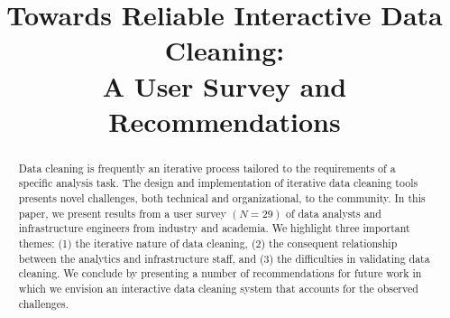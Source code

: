 \documentclass{sig-alternate-05-2015}
\begin{document}
\newtheorem{theorem}{Theorem}
\newtheorem{example}{Example}
\newtheorem{definition}{Definition}
\newtheorem{problem}{Problem}
\newtheorem{property}{Property}
\newtheorem{proposition}{Proposition}
\newtheorem{lemma}{Lemma}
\newtheorem{corollary}{Corollary}



\title{Towards Reliable Interactive Data Cleaning: \\ A User Survey and Recommendations}


\maketitle

\begin{abstract}
Data cleaning is frequently an iterative process tailored to the requirements of a specific analysis task.
The design and implementation of iterative data cleaning tools presents novel challenges, both technical and organizational, to the community.
In this paper, we present results from a user survey $(N=29)$ of data analysts and infrastructure engineers from industry and academia. We highlight three important themes: (1) the iterative nature of data cleaning, (2) the consequent relationship between the analytics and infrastructure staff, and (3) the difficulties in validating data cleaning.
We conclude by presenting a number of recommendations for future work in which we envision an interactive data cleaning system that accounts for the observed challenges.
\end{abstract}








 
\clearpage
\normalsize \selectfont
\end{document}

